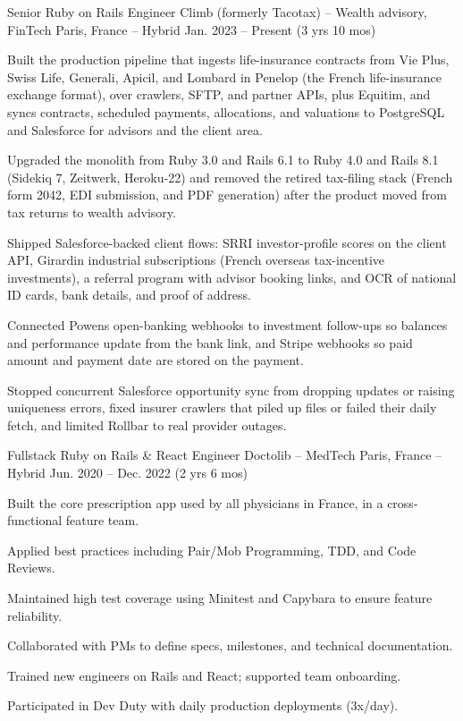 \begin{cventries}
\cventry
  {Senior Ruby on Rails Engineer}
  {Climb (formerly Tacotax) – Wealth advisory, FinTech}
  {Paris, France – Hybrid}
  {Jan. 2023 – Present (3 yrs 10 mos)}
  {
    \begin{cvitems}
      \item {Built the production pipeline that ingests life-insurance contracts from Vie Plus, Swiss Life, Generali, Apicil, and Lombard in Penelop (the French life-insurance exchange format), over crawlers, SFTP, and partner APIs, plus Equitim, and syncs contracts, scheduled payments, allocations, and valuations to PostgreSQL and Salesforce for advisors and the client area.}
      \item {Upgraded the monolith from Ruby 3.0 and Rails 6.1 to Ruby 4.0 and Rails 8.1 (Sidekiq 7, Zeitwerk, Heroku-22) and removed the retired tax-filing stack (French form 2042, EDI submission, and PDF generation) after the product moved from tax returns to wealth advisory.}
      \item {Shipped Salesforce-backed client flows: SRRI investor-profile scores on the client API, Girardin industrial subscriptions (French overseas tax-incentive investments), a referral program with advisor booking links, and OCR of national ID cards, bank details, and proof of address.}
      \item {Connected Powens open-banking webhooks to investment follow-ups so balances and performance update from the bank link, and Stripe webhooks so paid amount and payment date are stored on the payment.}
      \item {Stopped concurrent Salesforce opportunity sync from dropping updates or raising uniqueness errors, fixed insurer crawlers that piled up files or failed their daily fetch, and limited Rollbar to real provider outages.}
    \end{cvitems}
  }

\cventry
  {Fullstack Ruby on Rails \& React Engineer}
  {Doctolib – MedTech}
  {Paris, France – Hybrid}
  {Jun. 2020 – Dec. 2022 (2 yrs 6 mos)}
  {
    \begin{cvitems}
      \item {Built the core prescription app used by all physicians in France, in a cross-functional feature team.}
      \item {Applied best practices including Pair/Mob Programming, TDD, and Code Reviews.}
      \item {Maintained high test coverage using Minitest and Capybara to ensure feature reliability.}
      \item {Collaborated with PMs to define specs, milestones, and technical documentation.}
      \item {Trained new engineers on Rails and React; supported team onboarding.}
      \item {Participated in Dev Duty with daily production deployments (3x/day).}
    \end{cvitems}
  }


\end{cventries}

